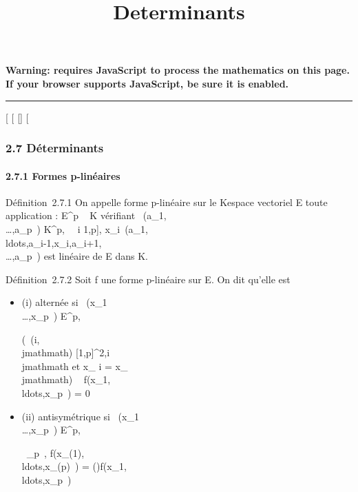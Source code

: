 \documentclass[]{article}
\title{Determinants}
\author{}
\date{}
\begin{document}
\maketitle

\textbf{Warning: 
requires JavaScript to process the mathematics on this page.\\ If your
browser supports JavaScript, be sure it is enabled.}

\begin{center}\rule{3in}{0.4pt}\end{center}

{[}
{[}
{[}{]}
{[}

\subsubsection{2.7 Déterminants}

\paragraph{2.7.1 Formes p-linéaires}

Définition~2.7.1 On appelle forme p-linéaire sur le Kespace vectoriel E
toute application \phi : E^p \rightarrow~ K vérifiant
\forall~(a_1,\\\ldots,a_p~)
\in K^p, \forall~~i \in {[}1,p{]},
x_i\mapsto~\phi(a_1,\\ldots,a_i-1,x_i,a_i+1,\\\ldots,a_p~)
est linéaire de E dans K.

Définition~2.7.2 Soit f une forme p-linéaire sur E. On dit qu'elle est

\begin{itemize}
\item
  (i) alternée si
  \forall~(x_1\\\ldots,x_p~)
  \in E^p,

  \left (\exists~(i,\\jmathmath) \in
  {[}1,p{]}^2,i\neq~\\jmathmath\text
  et x_ i = x_\\jmathmath\right ) \rigtharrow~
  f(x_1,\\ldots,x_p~)
  = 0
\item
  (ii) antisymétrique si
  \forall~(x_1\\\ldots,x_p~)
  \in E^p,

  \forall~\sigma \inS_p~,
  f(x_\sigma(1),\\ldots,x_\sigma(p)~)
  =
  \epsilon(\sigma)f(x_1,\\ldots,x_p~)
\end{itemize}
\end{document}
